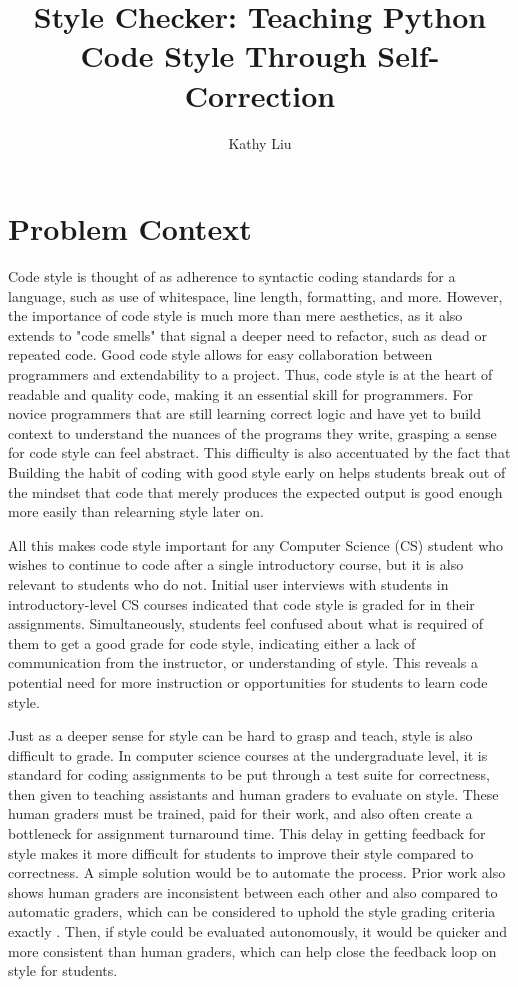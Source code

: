 \documentclass[10pt,twocolumn]{article}
\title{Style Checker: Teaching Python Code Style Through Self-Correction}
\author{Kathy Liu}
\affiliation{Occidental College}
\begin{document}
\maketitle

\section{Problem Context}
Code style is thought of as adherence to syntactic coding standards for a language, such as use of whitespace, line length, formatting, and more. 
However, the importance of code style is much more than mere aesthetics, as it also extends to "code smells" that signal a deeper need to refactor, such as dead or repeated code. 
Good code style allows for easy collaboration between programmers and extendability to a project.
Thus, code style is at the heart of readable and quality code, making it an essential skill for programmers. 
For novice programmers that are still learning correct logic and have yet to build context to understand the nuances of the programs they write, grasping a sense for code style can feel abstract. 
This difficulty is also accentuated by the fact that  
Building the habit of coding with good style early on helps students break out of the mindset that code that merely produces the expected output is good enough more easily than relearning style later on. 

All this makes code style important for any Computer Science (CS) student who wishes to continue to code after a single introductory course, but it is also relevant to students who do not. 
Initial user interviews with students in introductory-level CS courses indicated that code style is graded for in their assignments. 
Simultaneously, students feel confused about what is required of them to get a good grade for code style, indicating either a lack of communication from the instructor, or understanding of style. 
This reveals a potential need for more instruction or opportunities for students to learn code style. 

Just as a deeper sense for style can be hard to grasp and teach, style is also difficult to grade. 
In computer science courses at the undergraduate level, it is standard for coding assignments to be put through a test suite for correctness, then given to teaching assistants and human graders to evaluate on style. 
These human graders must be trained, paid for their work, and also often create a bottleneck for assignment turnaround time. 
This delay in getting feedback for style makes it more difficult for students to improve their style compared to correctness.
A simple solution would be to automate the process.
Prior work also shows human graders are inconsistent between each other and also compared to automatic graders, which can be considered to uphold the style grading criteria exactly \cite{perretta_2019}. 
Then, if style could be evaluated autonomously, it would be quicker and more consistent than human graders, which can help close the feedback loop on style for students. 
\end{document}
